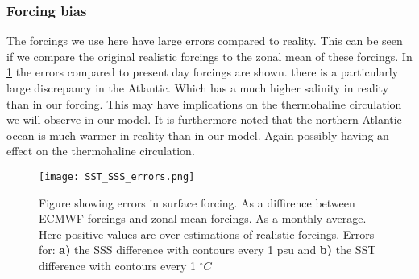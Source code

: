 \begin{multicols}{2}
 \subsubsection{Forcing bias} \label{sec:forc_err}
The forcings we use here have large errors compared to reality. This can be seen if we compare the original realistic forcings to the zonal mean of these forcings. In \cref{fig:sss_sst_errors} the errors compared to present day forcings are shown. there is a particularly large discrepancy in the Atlantic. Which has a much higher salinity in reality than in our forcing. This may have implications on the thermohaline circulation we will observe in our model. It is furthermore noted that the northern Atlantic ocean is much warmer in reality than in our model. Again possibly having an effect on the thermohaline circulation.
\end{multicols}
\begin{figure}[H]
	\texttt{[image: SST\_SSS\_errors.png]}
	\caption{Figure showing errors in surface forcing. As a diffirence between ECMWF forcings and zonal mean forcings. As a monthly average. Here positive values are over estimations of realistic forcings. Errors for: \textbf{a)} the SSS difference with contours every 1 psu and \textbf{b)} the SST difference with contours every 1 $^{\circ}C$}
	\label{fig:sss_sst_errors}
\end{figure}
